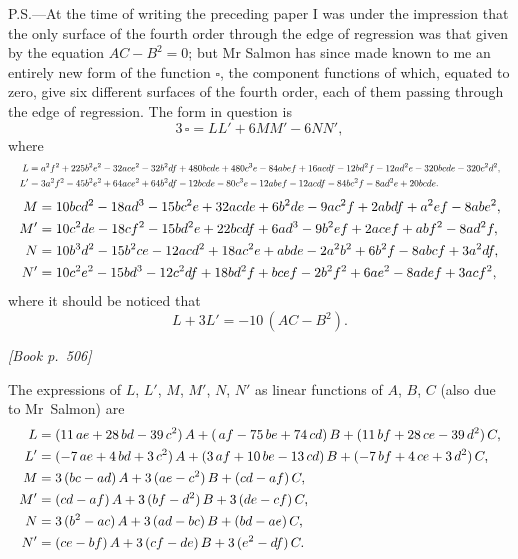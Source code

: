 \documentclass[11pt]{article}
\begin{document}
\medskip

\noindent P.S.---At the time of writing the preceding paper I was under the impression that the only surface of the fourth order through the edge of regression was that given by the equation $AC - B^{2} = 0$; but Mr Salmon has since made known to me an entirely new form of the function $\square$, the component functions of which, equated to zero, give six different surfaces of the fourth order, each of them passing through the edge of regression. The form in question is
\[
3\,\square = L L' + 6 M M' - 6 N N',
\]
where
\[ \resizebox{\textwidth}{!}{$\displaystyle
\begin{aligned}
L  &= a^{2} f^{2} + 225 b^{2} e^{2} - 32 a c e^{2} - 32 b^{2} d f + 480 b c d e + 480 c^{3} e - 84 a b e f + 16 a c d f - 12 b d^{2} f - 12 a d^{2} e - 320 b c d e - 320 c^{2} d^{2},\\
L' &= 3 a^{2} f^{2} - 45 b^{2} e^{2} + 64 a c e^{2} + 64 b^{2} d f - 12 b c d e - 80 c^{3} e - 12 a b e f - 12 a c d f - 84 b c^{2} f - 8 a d^{2} e + 20 b c d e.
\end{aligned}
$} \]
\[ \resizebox{\textwidth}{!}{$\displaystyle
\begin{aligned}
M  &= 10 b c d^{2} - 18 a d^{3} - 15 b c^{2} e + 32 a c d e + 6 b^{2} d e - 9 a c^{2} f + 2 a b d f + a^{2} e f - 8 a b e^{2},\\
M' &= 10 c^{2} d e - 18 c f^{2} - 15 b d^{2} e + 22 b c d f + 6 a d^{3} - 9 b^{2} e f + 2 a c e f + a b f^{2} - 8 a d^{2} f,\\
N  &= 10 b^{3} d^{2} - 15 b^{2} c e - 12 a c d^{2} + 18 a c^{2} e + a b d e - 2 a^{2} b^{2} + 6 b^{2} f - 8 a b c f + 3 a^{2} d f,\\
N' &= 10 c^{2} e^{2} - 15 b d^{3} - 12 c^{2} d f + 18 b d^{2} f + b c e f - 2 b^{2} f^{2} + 6 a e^{2} - 8 a d e f + 3 a c f^{2},
\end{aligned}
$} \]
where it should be noticed that
\[
L + 3 L' = -10\,(A C - B^{2}).
\]

\medskip
\noindent\textit{[Book p.~506]}\hfill

\smallskip

\noindent The expressions of $L$, $L'$, $M$, $M'$, $N$, $N'$ as linear functions of $A$, $B$, $C$ (also due to Mr~Salmon) are
\[ \resizebox{\textwidth}{!}{$\displaystyle
\begin{aligned}
L  &= (11\,a e + 28\,b d - 39\,c^{2})\,A + (\,a f - 75\,b e + 74\,c d)\,B + (11\,b f + 28\,c e - 39\,d^{2})\,C,\\
L' &= (-7\,a e + 4\,b d + 3\,c^{2})\,A + (3\,a f + 10\,b e - 13\,c d)\,B + (-7\,b f + 4\,c e + 3\,d^{2})\,C,\\
M  &= 3\,(b c - a d)\,A + 3\,(a e - c^{2})\,B + (c d - a f)\,C,\\
M' &= (c d - a f)\,A + 3\,(b f - d^{2})\,B + 3\,(d e - c f)\,C,\\
N  &= 3\,(b^{2} - a c)\,A + 3\,(a d - b c)\,B + (b d - a e)\,C,\\
N' &= (c e - b f)\,A + 3\,(c f - d e)\,B + 3\,(e^{2} - d f)\,C.
\end{aligned}
$} \]
\end{document}
